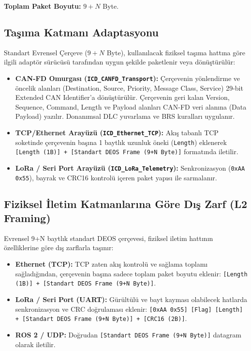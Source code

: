 \documentclass[a4paper,10pt]{article}
\newcommand{\hex}[1]{\texttt{0x#1}}
\newcommand{\code}[1]{\texttt{#1}}
\begin{document}
\textbf{Toplam Paket Boyutu:} $9 + N$ Byte.

\subsection{Taşıma Katmanı Adaptasyonu}

Standart Evrensel Çerçeve ($9+N$ Byte), kullanılacak fiziksel taşıma hattına göre ilgili adaptör sürücüsü tarafından uygun şekilde paketlenir veya dönüştürülür:

\begin{itemize}
    \item \textbf{CAN-FD Omurgası (\code{ICD\_CANFD\_Transport}):} Çerçevenin yönlendirme ve öncelik alanları (Destination, Source, Priority, Message Class, Service) 29-bit Extended CAN Identifier'a dönüştürülür. Çerçevenin geri kalan Version, Sequence, Command, Length ve Payload alanları CAN-FD veri alanına (Data Payload) yazılır. Donanımsal DLC yuvarlama ve BRS kuralları uygulanır.
    \item \textbf{TCP/Ethernet Arayüzü (\code{ICD\_Ethernet\_TCP}):} Akış tabanlı TCP soketinde çerçevenin başına 1 baytlık uzunluk öneki (\code{Length}) eklenerek \code{[Length (1B)] + [Standart DEOS Frame (9+N Byte)]} formatında iletilir.
    \item \textbf{LoRa / Seri Port Arayüzü (\code{ICD\_LoRa\_Telemetry}):} Senkronizasyon (\hex{AA} \hex{55}), bayrak ve CRC16 kontrolü içeren paket yapısı ile sarmalanır.
\end{itemize}

\subsection{Fiziksel İletim Katmanlarına Göre Dış Zarf (L2 Framing)}

Evrensel 9+N baytlık standart DEOS çerçevesi, fiziksel iletim hattının özelliklerine göre dış zarflarla taşınır:
\begin{itemize}
    \item \textbf{Ethernet (TCP):} TCP zaten akış kontrolü ve sağlama toplamı sağladığından, çerçevenin başına sadece toplam paket boyutu eklenir: \code{[Length (1B)] + [Standart DEOS Frame (9+N Byte)]}.
    \item \textbf{LoRa / Seri Port (UART):} Gürültülü ve bayt kayması olabilecek hatlarda senkronizasyon ve CRC doğrulaması eklenir: \code{[0xAA 0x55] [Flag] [Length] + [Standart DEOS Frame (9+N Byte)] + [CRC16 (2B)]}.
    \item \textbf{ROS 2 / UDP:} Doğrudan \code{[Standart DEOS Frame (9+N Byte)]} datagram olarak iletilir.
\end{itemize}
\end{document}
